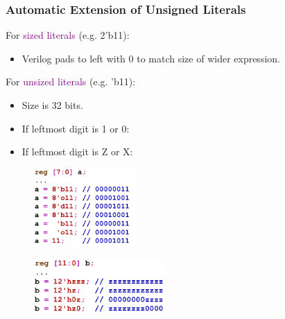 \documentclass[t, notes, xcolor=table]{beamer}
\begin{document}
\begin{frame}
\frametitle{Automatic Extension of Unsigned Literals}
\scriptsize{
For \textcolor{purple}{sized literals} (e.g. 2'b11):
\begin{itemize}
\item Verilog pads to left with 0 to match size of wider expression.
\end{itemize}

For \textcolor{purple}{unsized literals} (e.g. 'b11):
\begin{itemize}
\item Size is 32 bits.
\item If leftmost digit is 1 or 0: 
\item If leftmost digit is Z or X:
\end{itemize}
}

\begin{multicols}{2}

\begin{figure}
    \includegraphics[width=0.35\textwidth]{img/04_ext0.png}
\end{figure}
\vfill

\columnbreak

\begin{figure}
    \includegraphics[width=0.45\textwidth]{img/04_ext1.png}
\end{figure}
\end{multicols}

\end{frame}
\end{document}
